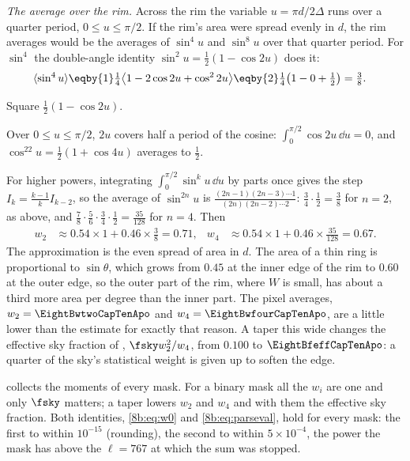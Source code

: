 \emph{The average over the rim.} Across the rim the variable $u=\pi d/2\Delta$ runs over a quarter period,
$0\le u\le\pi/2$. If the rim's area were spread evenly in $d$, the rim averages would be the averages of
$\sin^4u$ and $\sin^8u$ over that quarter period. For $\sin^4$ the double-angle identity
$\sin^2u=\tfrac12(1-\cos2u)$ does it:
\begin{align*}
  \langle\sin^4u\rangle
  &\eqby{1}\tfrac14\bigl\langle1-2\cos2u+\cos^22u\bigr\rangle
   \eqby{2}\tfrac14\bigl(1-0+\tfrac12\bigr)=\tfrac38 .
\end{align*}
\begin{explain}
  \item Square $\tfrac12(1-\cos2u)$.
  \item Over $0\le u\le\pi/2$, $2u$ covers half a period of the cosine: $\int_0^{\pi/2}\cos2u\,\dd u=0$, and
        $\cos^22u=\tfrac12(1+\cos4u)$ averages to $\tfrac12$.
\end{explain}
For higher powers, integrating $\int_0^{\pi/2}\sin^ku\,\dd u$ by parts once gives the step
$I_k=\frac{k-1}kI_{k-2}$, so the average of $\sin^{2n}u$ is $\frac{(2n-1)(2n-3)\cdots1}{(2n)(2n-2)\cdots2}$: $\tfrac34\cdot\tfrac12=\tfrac38$
for $n=2$, as above, and $\tfrac78\cdot\tfrac56\cdot\tfrac34\cdot\tfrac12=\tfrac{35}{128}$ for $n=4$. Then
\begin{align*}
  w_2&\approx0.54\times1+0.46\times\tfrac38=0.71,&
  w_4&\approx0.54\times1+0.46\times\tfrac{35}{128}=0.67 .
\end{align*}
The approximation is the even spread of area in $d$. The area of a thin ring is proportional to
$\sin\theta$, which grows from $0.45$ at the inner edge of the rim to $0.60$ at the outer edge, so the
outer part of the rim, where $W$ is small, has about a third more area per degree than the inner part.
The pixel averages, $w_2=\EightBwtwoCapTenApo$ and $w_4=\EightBwfourCapTenApo$, are a little lower than the estimate
for exactly that reason. A
taper this wide changes the effective sky fraction of ,
$\fsky w_2^2/w_4$, from $0.100$ to $\EightBfeffCapTenApo$: a quarter of the sky's statistical
weight is given up to soften the edge.

 collects the moments of every mask. For a binary mask all the $w_i$ are one
and only $\fsky$ matters; a taper lowers $w_2$ and $w_4$ and with them the effective sky
fraction. Both identities, \eqref{8b:eq:w0} and \eqref{8b:eq:parseval}, hold for every mask: the
first to within $10^{-15}$ (rounding), the second to within $5\times10^{-4}$, the power the mask
has above the $\ell=767$ at which the sum was stopped.

